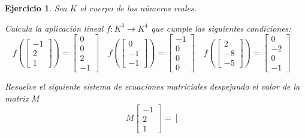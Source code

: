 \documentclass[12pt]{amsart}
\newtheorem{ejer}{Ejercicio}
\begin{document}
\begin{ejer} Sea $K$ el cuerpo de los n\'umeros reales.
\newline
\noindent\begin{minipage}{\textwidth}
\begin{tcolorbox}[colback = green!20!white,title=Versión Aplicación]
Calcula la aplicaci\'on lineal $f:K^{3} \to K^{4}$ que cumple las siguientes condiciones: 
\[f\left(\left[\begin{array}{r}
-1 \\
2 \\
1
\end{array}\right]\right) = \left[\begin{array}{r}
0 \\
0 \\
2 \\
-1
\end{array}\right] \quad f\left(\left[\begin{array}{r}
0 \\
-1 \\
-1
\end{array}\right]\right) = \left[\begin{array}{r}
-1 \\
0 \\
0 \\
0
\end{array}\right] \quad f\left(\left[\begin{array}{r}
2 \\
-8 \\
-5
\end{array}\right]\right) = \left[\begin{array}{r}
0 \\
-2 \\
0 \\
-1
\end{array}\right] \quad 
\]\end{tcolorbox}
\end{minipage} \newline
\noindent\begin{minipage}{\textwidth}
\begin{tcolorbox}[colback = blue!20!white,title=Versión Sistema Matricial]
Resuelve el siguiente sistema de ecuaciones matriciales despejando el valor de la matriz $M$
\[M \left[\begin{array}{r}
-1 \\
2 \\
1
\end{array}\right] = \left[\begin{array}{r}

\end{array}\]
\end{tcolorbox}
\end{minipage}
\end{ejer}
\end{document}
